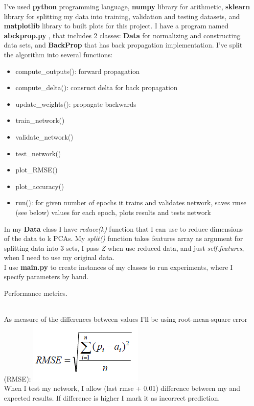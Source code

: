 \documentclass[12pt, letterpaper]{article}
\begin{document}
\begin{enumerate}[label=\Roman*.]
	I've used {\bf python} programming language, {\bf numpy} library for arithmetic, {\bf sklearn} library for splitting my data into training, validation and testing datasets, and {\bf matplotlib} library to built plots for this project. I have a program named {\bf abckprop.py} , that includes 2 classes: {\bf Data} for normalizing and constructing data sets, and {\bf BackProp} that has back propagation implementation. I've split the algorithm into several functions:
	\begin{itemize}
		\item compute\_outputs(): forward propagation
		\item compute\_delta(): consruct delta for back propagation
		\item update\_weights(): propagate backwards
		\item train\_network()
		\item validate\_network()
		\item test\_network()
		\item plot\_RMSE()
		\item plot\_accuracy()
		\item run(): for given number of epochs it trains and validates network, saves rmse (see below) values for each epoch, plots results and tests network
	\end{itemize}
	
	In my {\bf Data} class I have {\it reduce(k)} function that I can use to reduce dimensions of the data to k PCAs. My {\it split()} function takes features array as argument for splitting data into 3 sets, I pass {\it Z} when use reduced data, and just {\it self.features}, when I need to use my original data.\\
	
	I use {\bf main.py} to create instances of my classes to run experiments, where I specify parameters by hand.\\
	
	{\bf \item Performance metrics.}\\
	
	As measure of the differences between values I'll be using root-mean-square error (RMSE):
	{\center \includegraphics[scale=0.5]{6.png} \\}
	When I test my network, I allow (last rmse + 0.01)  difference between my and expected results. If difference is higher I mark it as incorrect prediction. \\
	

\end{enumerate}
\end{document}
